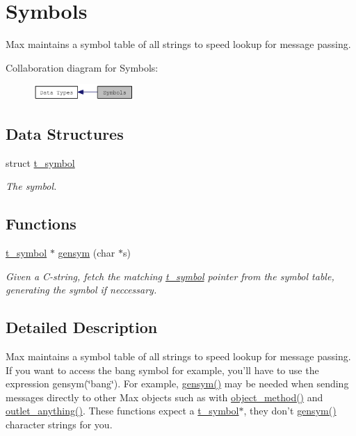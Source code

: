 \hypertarget{group__symbol}{
\section{Symbols}
\label{group__symbol}
}


Max maintains a symbol table of all strings to speed lookup for message passing.  


Collaboration diagram for Symbols:\nopagebreak
\begin{figure}[H]
\begin{center}
\leavevmode
\includegraphics[width=109pt]{group__symbol}
\end{center}
\end{figure}
\subsection*{Data Structures}
\begin{DoxyCompactItemize}
\item 
struct \hyperlink{structt__symbol}{t\_\-symbol}
\begin{DoxyCompactList}\small\item\em The symbol. \item\end{DoxyCompactList}\end{DoxyCompactItemize}
\subsection*{Functions}
\begin{DoxyCompactItemize}
\item 
\hyperlink{structt__symbol}{t\_\-symbol} $\ast$ \hyperlink{group__symbol_ga8268797d125a15bae1010af70b559e05}{gensym} (char $\ast$s)
\begin{DoxyCompactList}\small\item\em Given a C-\/string, fetch the matching \hyperlink{structt__symbol}{t\_\-symbol} pointer from the symbol table, generating the symbol if neccessary. \item\end{DoxyCompactList}\end{DoxyCompactItemize}


\subsection{Detailed Description}
Max maintains a symbol table of all strings to speed lookup for message passing. If you want to access the bang symbol for example, you’ll have to use the expression gensym(\char`\"{}bang\char`\"{}). For example, \hyperlink{group__symbol_ga8268797d125a15bae1010af70b559e05}{gensym()} may be needed when sending messages directly to other Max objects such as with \hyperlink{group__obj_gae740749094827ac5adc2b7145db1c596}{object\_\-method()} and \hyperlink{group__inout_ga12798ee897e01dac21ee547c4091d8a8}{outlet\_\-anything()}. These functions expect a \hyperlink{structt__symbol}{t\_\-symbol}$\ast$, they don’t \hyperlink{group__symbol_ga8268797d125a15bae1010af70b559e05}{gensym()} character strings for you.

